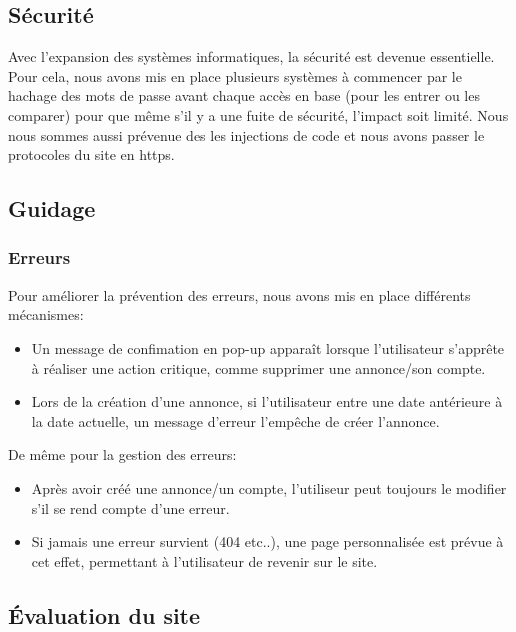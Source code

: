 \documentclass[a4paper,11pt]{article}
\begin{document}
\subsection{Sécurité}
Avec l'expansion des systèmes informatiques, la sécurité est devenue essentielle. Pour cela, nous avons mis en place plusieurs systèmes à commencer par le hachage des mots de passe avant chaque accès en base (pour les entrer ou les comparer) pour que même s'il y a une fuite de sécurité, l'impact soit limité. Nous nous sommes aussi prévenue des les injections de code et nous avons passer le protocoles du site en https.

\subsection{Guidage}
\subsubsection{Erreurs}
Pour améliorer la prévention des erreurs, nous avons mis en place différents mécanismes:
\begin{itemize}
  \item Un message de confimation en pop-up apparaît lorsque l'utilisateur s'apprête à réaliser une action critique, comme supprimer une annonce/son compte.
  \item Lors de la création d'une annonce, si l'utilisateur entre une date antérieure à la date actuelle, un message d'erreur l'empêche de créer l'annonce.
\end{itemize}

De même pour la gestion des erreurs:
\begin{itemize}
  \item Après avoir créé une annonce/un compte, l'utiliseur peut toujours le modifier s'il se rend compte d'une erreur.
  \item Si jamais une erreur survient (404 etc..), une page personnalisée est prévue à cet effet, permettant à l'utilisateur de revenir sur le site.
\end{itemize}


\subsection{Évaluation du site}
\end{document}
